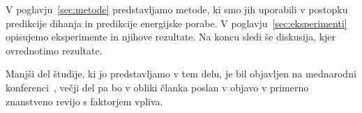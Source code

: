 V poglavju~\ref{sec:metode}  predstavljamo metode, ki smo jih uporabili v postopku predikcije dihanja in predikcije energijske porabe. V poglavju~\ref{sec:eksperimenti} opisujemo eksperimente in njihove rezultate. Na koncu sledi še diskusija, kjer ovrednotimo rezultate.

Manjši del študije, ki jo predstavljamo v tem delu, je bil objavljen na mednarodni konferenci~\cite{koporec2017observation}, večji del pa bo v obliki članka poslan v objavo v primerno znanstveno revijo s faktorjem vpliva.
